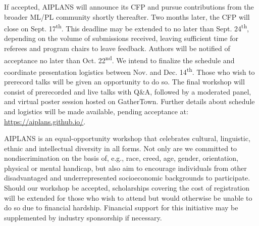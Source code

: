 \documentclass{article}
\begin{document}
    If accepted, AIPLANS will announce its CFP and pursue contributions from the broader ML/PL community shortly thereafter. Two months later, the CFP will close on Sept. 17\textsuperscript{th}. This deadline may be extended to no later than Sept. 24\textsuperscript{th}, depending on the volume of submissions received, leaving sufficient time for referees and program chairs to leave feedback. Authors will be notified of acceptance no later than Oct. 22\textsuperscript{nd}. We intend to finalize the schedule and coordinate presentation logistics between Nov. and Dec. 14\textsuperscript{th}. Those who wish to prerecord talks will be given an opportunity to do so. The final workshop will consist of prerecorded and live talks with Q\&A, followed by a moderated panel, and virtual poster session hosted on GatherTown. Further details about schedule and logistics will be made available, pending acceptance at: \url{https://aiplans.github.io/}.

    AIPLANS is an equal-opportunity workshop that celebrates cultural, linguistic, ethnic and intellectual diversity in all forms. Not only are we committed to nondiscrimination on the basis of, e.g., race, creed, age, gender, orientation, physical or mental handicap, but also aim to encourage individuals from other disadvantaged and underrepresented socioeconomic backgrounds to participate. Should our workshop be accepted, scholarships covering the cost of registration will be extended for those who wish to attend but would otherwise be unable to do so due to financial hardship. Financial support for this initiative may be supplemented by industry sponsorship if necessary.


    \newpage
\end{document}
